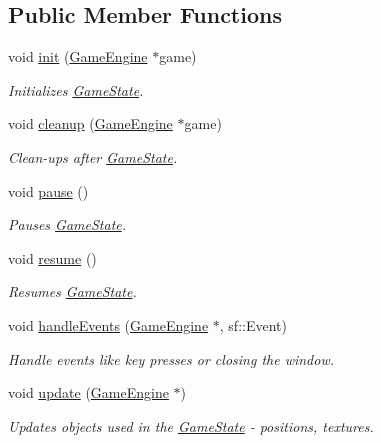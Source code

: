 \subsection*{Public Member Functions}
\begin{DoxyCompactItemize}
\item 
void \mbox{\hyperlink{class_p2_serve_state_a7f6cbb73e0d08949e3df08b97ba089f5}{init}} (\mbox{\hyperlink{class_game_engine}{Game\+Engine}} $\ast$game)
\begin{DoxyCompactList}\small\item\em Initializes \mbox{\hyperlink{class_game_state}{Game\+State}}. \end{DoxyCompactList}\item 
void \mbox{\hyperlink{class_p2_serve_state_ab5cbfaef01142275fcb6aa2947c9e1b6}{cleanup}} (\mbox{\hyperlink{class_game_engine}{Game\+Engine}} $\ast$game)
\begin{DoxyCompactList}\small\item\em Clean-\/ups after \mbox{\hyperlink{class_game_state}{Game\+State}}. \end{DoxyCompactList}\item 
void \mbox{\hyperlink{class_p2_serve_state_aa72fcf3306cf089d1efc7122a8147139}{pause}} ()
\begin{DoxyCompactList}\small\item\em Pauses \mbox{\hyperlink{class_game_state}{Game\+State}}. \end{DoxyCompactList}\item 
void \mbox{\hyperlink{class_p2_serve_state_a46b9a456d44c6f22bf5bbdb62e71e490}{resume}} ()
\begin{DoxyCompactList}\small\item\em Resumes \mbox{\hyperlink{class_game_state}{Game\+State}}. \end{DoxyCompactList}\item 
void \mbox{\hyperlink{class_p2_serve_state_af7634dd3bdfca0279b5c9abc6632b2e4}{handle\+Events}} (\mbox{\hyperlink{class_game_engine}{Game\+Engine}} $\ast$, sf\+::\+Event)
\begin{DoxyCompactList}\small\item\em Handle events like key presses or closing the window. \end{DoxyCompactList}\item 
void \mbox{\hyperlink{class_p2_serve_state_a1f0ddd25c72c4e9033418a32f5389e22}{update}} (\mbox{\hyperlink{class_game_engine}{Game\+Engine}} $\ast$)
\begin{DoxyCompactList}\small\item\em Updates objects used in the \mbox{\hyperlink{class_game_state}{Game\+State}} -\/ positions, textures. \end{DoxyCompactList}\item 

\end{DoxyCompactItemize}
